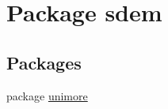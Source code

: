 \hypertarget{namespacesdem}{\section{Package sdem}
\label{namespacesdem}
}
\subsection*{Packages}
\begin{DoxyCompactItemize}
\item 
package \hyperlink{namespacesdem_1_1unimore}{unimore}
\end{DoxyCompactItemize}
